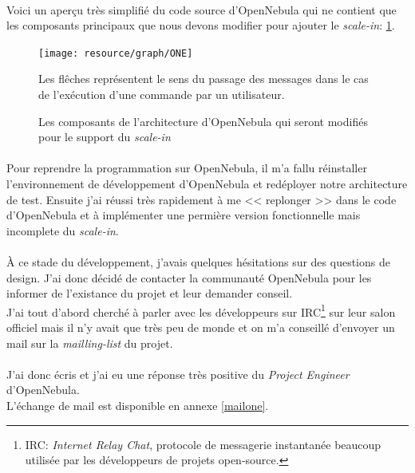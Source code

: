 \paragraph*{}
Voici un aperçu très simplifié du code source d'OpenNebula qui ne contient que les composants principaux que nous devons modifier pour ajouter le \emph{scale-in}: \ref{archionescalein}.

\begin{figure}[H]
\centering
\texttt{[image: resource/graph/ONE]}
\caption{Les composants de l'architecture d'OpenNebula qui seront modifiés pour le support du \emph{scale-in}\\}
Les flêches représentent le sens du passage des messages dans le cas de l'exécution d'une commande par un utilisateur.
\label{archionescalein}
\end{figure}


\paragraph*{}
Pour reprendre la programmation sur OpenNebula, il m'a fallu réinstaller l'environnement de développement d'OpenNebula et redéployer notre architecture de test.
Ensuite j'ai réussi très rapidement à me << replonger >> dans le code d'OpenNebula et à implémenter une permière version fonctionnelle mais incomplete du \emph{scale-in}.

\paragraph*{}
À ce stade du développement, j'avais quelques hésitations sur des questions de design. J'ai donc décidé de contacter la communauté OpenNebula pour les informer de l'existance
du projet et leur demander conseil.\\
J'ai tout d'abord cherché à parler avec les développeurs sur IRC\footnote{IRC: \emph{Internet Relay Chat}, protocole de messagerie instantanée beaucoup utilisée
par les développeurs de projets open-source.} sur leur salon officiel mais il n'y avait que très peu de monde et on m'a conseillé d'envoyer un mail sur la \emph{mailling-list} du
projet.

\paragraph*{}
J'ai donc écris et j'ai eu une réponse très positive du \emph{Project Engineer} d'OpenNebula.\\
L'échange de mail est disponible en annexe \ref{mailone}.


